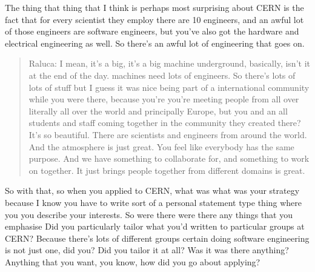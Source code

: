 \documentclass[
]{book}
\begin{document}
The thing that thing that I think is perhaps most surprising about CERN is the fact that for every scientist they employ there are 10 engineers, and an awful lot of those engineers are software engineers, but you've also got the hardware and electrical engineering as well. So there's an awful lot of engineering that goes on.

\begin{quote}
Raluca: I mean, it's a big, it's a big machine underground, basically, isn't it at the end of the day. machines need lots of engineers. So there's lots of lots of stuff but I guess it was nice being part of a international community while you were there, because you're you're meeting people from all over literally all over the world and principally Europe, but you and an all students and staff coming together in the community they created there? It's so beautiful. There are scientists and engineers from around the world. And the atmosphere is just great. You feel like everybody has the same purpose. And we have something to collaborate for, and something to work on together. It just brings people together from different domains is great.
\end{quote}

So with that, so when you applied to CERN, what was what was your strategy because I know you have to write sort of a personal statement type thing where you you describe your interests. So were there were there any things that you emphasise Did you particularly tailor what you'd written to particular groups at CERN? Because there's lots of different groups certain doing software engineering is not just one, did you? Did you tailor it at all? Was it was there anything? Anything that you want, you know, how did you go about applying?
\end{document}
